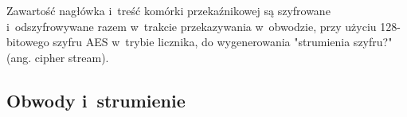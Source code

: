 \begin{description}
\begin{description}
\begin{description}
\begin{description}
\begin{description}
       \end{description}
	\item Zawartość nagłówka i~treść komórki przekaźnikowej są szyfrowane i~odszyfrowywane razem w~trakcie przekazywania w~obwodzie, przy użyciu 128-bitowego szyfru AES w~trybie licznika, do wygenerowania "strumienia szyfru?" (ang. cipher stream).
       
      \end{description}

     \end{description}
     
    \end{description}

   \end{description}

\subsection{Obwody i~strumienie}
